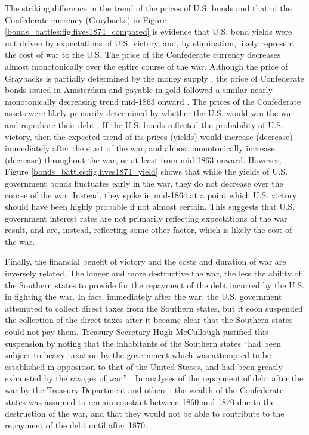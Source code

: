 The striking difference in the trend of the prices of U.S. bonds and that of the Confederate currency (Graybacks) in Figure \ref{bonds_battles:fig:fives1874_compared} is evidence that U.S. bond yields were not driven by expectations of U.S. victory, and, by elimination, likely represent the cost of war to the U.S.
The price of the Confederate currency decreases almost monotonically over the entire course of the war.
Although the price of Graybacks is partially determined by the money supply \parencite{BurdekinWeidenmier2001}, the price of Confederate bonds issued in Amsterdam and payable in gold followed a similar nearly monotonically decreasing trend mid-1863 onward \parencite{HaberMitchenerOosterlinckEtAl2015}.
The prices of the Confederate assets were likely primarily determined by whether the U.S. would win the war and repudiate their debt \parencite{HaberMitchenerOosterlinckEtAl2015}.
If the U.S. bonds reflected the probability of U.S. victory, then the expected trend of its prices (yields) would increase (decrease) immediately after the start of the war, and almost monotonically increase (decrease) throughout the war, or at least from mid-1863 onward.
However, Figure \ref{bonds_battles:fig:fives1874_yield} shows that while the yields of U.S. government bonds fluctuates early in the war, they do not decrease over the course of the war.
Instead, they spike in mid-1864 at a point which U.S. victory should have been highly probable if not almost certain. 
This suggests that U.S. government interest rates are not primarily reflecting expectations of the war result, and are, instead, reflecting some other factor, which is likely the cost of the war.

Finally, the financial benefit of victory and the costs and duration of war are inversely related.
The longer and more destructive the war, the less the ability of the Southern states to provide for the repayment of the debt incurred by the U.S. in fighting the war.
In fact, immediately after the war, the U.S. government attempted to collect direct taxes from the Southern states, but it soon suspended the collection of the direct taxes after it became clear that the Southern states could not pay them.
Treasury Secretary Hugh McCullough justified this suspension by noting that the inhabitants of the Southern states ``had been subject to heavy taxation by the government which was attempted to be established in opposition to that of the United States, and had been greatly exhausted by the ravages of war.'' \parencite[29]{Treasury1865}.
In analyses of the repayment of debt after the war by the Treasury Department and others \parencites{Elder1865}{Treasury1865}{Walker1865a}, the wealth of the Confederate states was assumed to remain constant between 1860 and 1870 due to the destruction of the war, and that they would not be able to contribute to the repayment of the debt until after 1870.

